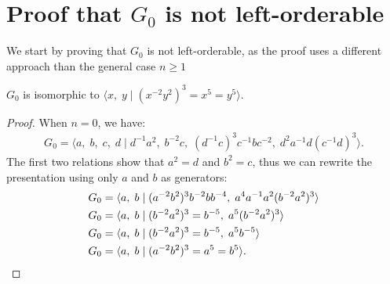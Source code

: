 
\section{Proof that $G_0$ is not left-orderable}
\label{section:G_0}
We start by proving that $G_0$ is not left-orderable, as the proof uses a different approach than the general case $n\geq1$
\begin{lemma} $G_0$ is isomorphic to $\langle x,\; y\mid{}(x^{-2}y^{2})^{3}=x^{5}=y^{5} \rangle$.
\end{lemma}
\begin{proof} When $n=0$, we have:
\begin{align*}
G_0=\langle a,\; b,\; c,\; d \mid{} d^{-1}a^{2},\; b^{-2}c,\; (d^{-1}c)^{3}c^{-1}bc^{-2},\; d^{2}a^{-1}d(c^{-1}d)^{3} \rangle.
\end{align*}
The first two relations show that $a^{2}=d$ and $b^{2}=c$, thus we can rewrite the presentation using only $a$ and $b$ as generators:
\begin{align*}
G_0&=\langle a,\;b\mid{} (a^{-2}b^{2})^{3}b^{-2}bb^{-4},\; a^{4}a^{-1}a^{2}(b^{-2}a^{2})^{3} \rangle\\
G_0&=\langle a,\;b\mid{} (b^{-2}a^{2})^{3}=b^{-5},\; a^{5}(b^{-2}a^{2})^{3} \rangle\\
G_0&=\langle a,\;b\mid{} (b^{-2}a^{2})^{3}=b^{-5},\; a^{5}b^{-5} \rangle\\
G_0&=\langle a,\;b\mid{} (a^{-2}b^{2})^{3}=a^{5}=b^{5} \rangle.\qedhere
\end{align*}
\end{proof}

